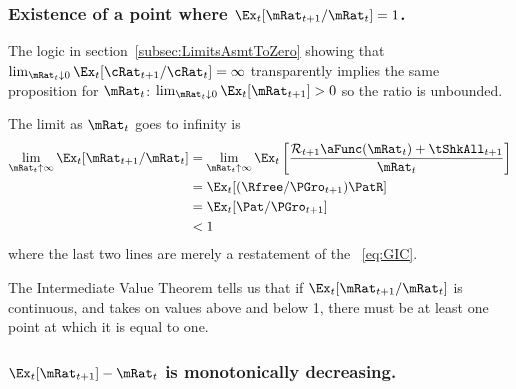 \documentclass[BufferStockTheory]{subfiles}
\begin{document}
\subsubsection{Existence of a point where $\Ex_t [{\mRat}_{t+1}/\mRat_t]=1$.}
The logic in section~\ref{subsec:LimitsAsmtToZero} showing that $\lim_{\mRat_t \downarrow 0} 
\Ex_t [{\cRat}_{t+1}/\cRat_t] = \infty$ transparently implies the same proposition for $\mRat_{t}$: $\lim_{\mRat_{t}\downarrow 0} \Ex_{t}[\mRat_{t+1}] > 0$ so the ratio is unbounded. 

The limit as $\mRat_{t}$ goes to infinity is
\begin{align}
  \lim_{\mRat_{t} \uparrow \infty} \Ex_{t}[{\mRat}_{t+1}/\mRat_{t}]  & =   
                                                                       \lim_{\mRat_{t} \uparrow \infty} 
                                                                       \Ex_{t}\left[\frac{{\mathcal{\mathcal{R}}}_{t+1}\aFunc(\mRat_{t})+{\tShkAll}_{t+1}}{\mRat_{t}}\right] \notag 
  \\  & = \Ex_{t}[(\Rfree/{\PGro}_{t+1})\PatR]
  \\  & = \Ex_{t}[{\Pat}/{\PGro}_{t+1}] \notag
  \\  & < 1 \notag
\end{align}
where the last two lines are merely a restatement of the \GIC~\eqref{eq:GIC}.

The Intermediate Value Theorem tells us that if $\Ex_t [{\mRat}_{t+1}/\mRat_t]$ is continuous, and takes on values above and below 1, there must be at least one point at which it is equal to one.

\subsubsection{$\Ex_t [{\mRat}_{t+1}] -\mRat_t$ is monotonically decreasing.}
\end{document}
